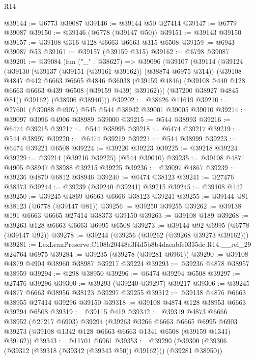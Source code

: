 \begin{lexlean}{R14}
\begin{coremodule}
@39144 := @6773 @39087
@39146 := @39144 @50 @27414
@39147 := @6779 @39087
@39150 := @39146 (@6778 (@39147 @50))
@39151 := @39143 @39150
@39157 := @39108 @316 @128 @6663 @6663 @315 @6508
@39159 := @6943 @39087 @53
@39161 := @39157 (@39159 @315)
@39162 := @6798 @39087
@39201 := @39084
    (fun ("_" : @38627) =>
    @39096
      (@39107
        (@39114
          (@39124
            (@39130
              (@39137 (@39151 (@39161 @39162)) (@38874 @6975 @314))
              (@39108
                @4847
                @442
                @6663
                @6665
                @4846
                @36038
                (@39159 @4846)
                (@39108 @440 @128 @6663 @6663 @439 @6508 (@39159 @439) @39162)))
            (@37200 @38927 @4845 @81))
          @39162)
        (@38906 @38940)))
@39202 := @38626 @11619
@39210 := @27601 (@39088 @4907) @545 @544 @38942 @39001 @39005 @39010
@39214 := @39097 @3096 @4906 @38989 @39000
@39215 := @544 @38993
@39216 := @6474 @39215
@39217 := @544 @38995
@39218 := @6474 @39217
@39219 := @544 @38997
@39220 := @6474 @39219
@39221 := @544 @38999
@39223 := @6474 @39221 @6508
@39224 := @39220 @39223
@39225 := @39218 @39224
@39229 := @39214 (@39216 @39225) (@544 @39010)
@39235 := @39108 @4871 @4905 @38947 @38988 @39215 @39225
@39236 := @39097 @4867
@39239 := @39236 @4870 @6812 @38946
@39240 := @6474 @38123
@39241 := @27476 @38373
@39244 := @39239 (@39240 @39241) @39215
@39245 := @39108 @142
@39250 := @39245 @4869 @6663 @6666 @38123 @39241
@39255 := @39144 @81 @38123 (@6778 (@39147 @81))
@39256 := @39250 @39255
@39262 := @39138 @191 @6663 @6665 @27414 @38373 @39150
@39263 := @39108 @189
@39268 := @39263 @128 @6663 @6663 @6995 @6508
@39273 := @39144 @92 @6995 (@6778 (@39147 @92))
@39278 := @39244 (@39256 (@39262 (@39268 @39273 @39162)))
@39281 := LexLeanPreserve.C108b20448a3f4d5b8b4daeabfe0335dc.R14.__rel_29 @24764 @6975
@39284 := @39235 (@39278 (@39281 @6961))
@39290 := @39108 @4879 @4904 @38960 @38987 @39217 @39224
@39293 := @39236 @4878 @38957 @38959
@39294 := @298 @38950
@39296 := @6474 @39294 @6508
@39297 := @27476 @39296
@39300 := @39293 (@39240 @39297) @39217
@39306 := @39245 @4877 @6663 @38956 @38123 @39297 @39255
@39312 := @39138 @4876 @6663 @38955 @27414 @39296 @39150
@39318 := @39108 @4874 @128 @38953 @6663 @39294 @6508
@39319 := @39115 @419
@39342 := @39319
    @4873
    @6666
    @38952
    (@27217 @6903)
    @39294
    (@39263
      @3266
      @6663
      @6665
      @6995
      @6903
      @39273
      (@39108 @1342 @128 @6663 @6663 @1341 @6508 (@39159 @1341) @39162))
@39343 := @11701 @6961
@39353 := @39290 (@39300 (@39306 (@39312 (@39318 (@39342 (@39343 @50)) @39162))) (@39281 @38950))

\end{coremodule}
\end{lexlean}
